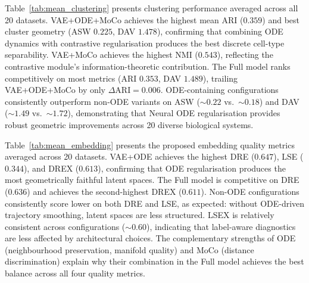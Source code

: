 \documentclass[biology,article,submit,pdftex]{Definitions/mdpi}
\begin{document}
Table~\ref{tab:mean_clustering} presents clustering performance averaged across all 20 datasets. VAE+ODE+MoCo achieves the highest mean ARI ($0.359$) and best cluster geometry (ASW $0.225$, DAV $1.478$), confirming that combining ODE dynamics with contrastive regularisation produces the best discrete cell-type separability. VAE+MoCo achieves the highest NMI ($0.543$), reflecting the contrastive module's information-theoretic contribution. The Full model ranks competitively on most metrics (ARI $0.353$, DAV $1.489$), trailing VAE+ODE+MoCo by only $\Delta\text{ARI}{=}0.006$. ODE-containing configurations consistently outperform non-ODE variants on ASW (${\sim}0.22$ vs.\ ${\sim}0.18$) and DAV (${\sim}1.49$ vs.\ ${\sim}1.72$), demonstrating that Neural ODE regularisation provides robust geometric improvements across 20 diverse biological systems.

\begin{table}[!t]
    \centering
    \caption{Cross-dataset mean clustering metrics (20 datasets, split=whole). Best per column in \textbf{bold}. DAV$\downarrow$ indicates lower is better.}
    \label{tab:mean_clustering}
\end{table}

Table~\ref{tab:mean_embedding} presents the proposed embedding quality metrics averaged across 20 datasets. VAE+ODE achieves the highest DRE ($0.647$), LSE ($0.344$), and DREX ($0.613$), confirming that ODE regularisation produces the most geometrically faithful latent spaces. The Full model is competitive on DRE ($0.636$) and achieves the second-highest DREX ($0.611$). Non-ODE configurations consistently score lower on both DRE and LSE, as expected: without ODE-driven trajectory smoothing, latent spaces are less structured. LSEX is relatively consistent across configurations (${\sim}0.60$), indicating that label-aware diagnostics are less affected by architectural choices. The complementary strengths of ODE (neighbourhood preservation, manifold quality) and MoCo (distance discrimination) explain why their combination in the Full model achieves the best balance across all four quality metrics.
\end{document}
